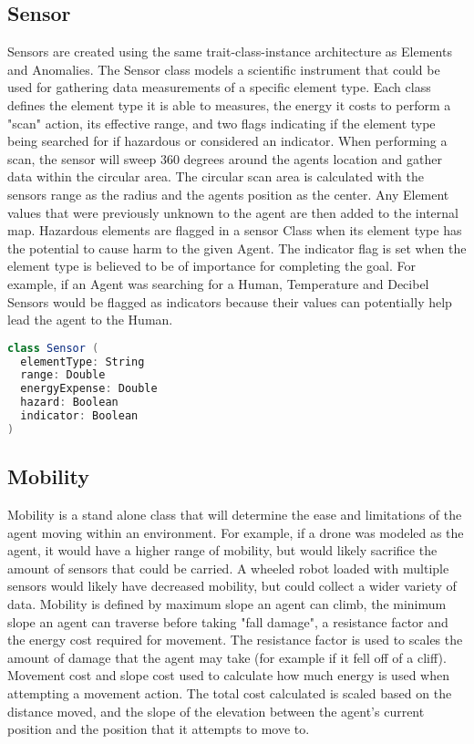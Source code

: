 \subsection{Sensor}
Sensors are created using the same trait-class-instance architecture as Elements and Anomalies.
The Sensor class models a scientific instrument that could be used for gathering data measurements of a specific element type.
Each class defines the element type it is able to measures, the energy it costs to perform a "scan" action, its effective range, and two flags indicating if the element type being searched for if hazardous or considered an indicator.
When performing a scan, the sensor will sweep 360 degrees around the agents location and gather data within the circular area.
The circular scan area is calculated with the sensors range as the radius and the agents position as the center.
Any Element values that were previously unknown to the agent are then added to the internal map.
Hazardous elements are flagged in a sensor Class when its element type has the potential to cause harm to the given Agent.
The indicator flag is set when the element type is believed to be of importance for completing the goal.
For example, if an Agent was searching for a Human, Temperature and Decibel Sensors would be flagged as indicators because their values can potentially help lead the agent to the Human.

\begin{lstlisting}[language=Scala]
class Sensor (
  elementType: String
  range: Double
  energyExpense: Double
  hazard: Boolean
  indicator: Boolean
)
\end{lstlisting}


\subsection{Mobility}
Mobility is a stand alone class that will determine the ease and limitations of the agent moving within an environment.
For example, if a drone was modeled as the agent, it would have a higher range of mobility, but would likely sacrifice the amount of sensors that could be carried.
A wheeled robot loaded with multiple sensors would likely have decreased mobility, but could collect a wider variety of data.
Mobility is defined by maximum slope an agent can climb, the minimum slope an agent can traverse before taking "fall damage", a resistance factor and the energy cost required for movement.
The resistance factor is used to scales the amount of damage that the agent may take (for example if it fell off of a cliff).
Movement cost and slope cost used to calculate how much energy is used when attempting a movement action.
The total cost calculated is scaled based on the distance moved, and the slope of the elevation between the agent's current position and the position that it attempts to move to.


